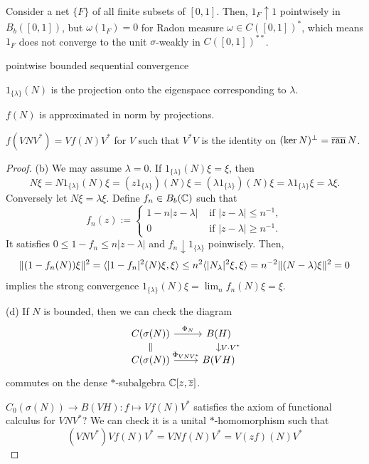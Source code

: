 \documentclass{../../large}
\begin{document}
\begin{prb}
Consider a net $\{F\}$ of all finite subsets of $[0,1]$.
Then, $1_F\uparrow1$ pointwisely in $B_b([0,1])$, but $\omega(1_F)=0$ for Radon measure $\omega\in C([0,1])^*$, which means $1_F$ does not converge to the unit $\sigma$-weakly in $C([0,1])^{**}$.
\begin{parts}
\item pointwise bounded sequential convergence
\item $1_{\{\lambda\}}(N)$ is the projection onto the eigenspace corresponding to $\lambda$.
\item $f(N)$ is approximated in norm by projections.
\item $f(VNV^*)=Vf(N)V^*$ for $V$ such that $V^*V$ is the identity on $(\ker N)^\perp=\overline{\operatorname{ran}}\,N$.
\end{parts}
\end{prb}
\begin{proof}
(b)
We may assume $\lambda=0$.
If $1_{\{\lambda\}}(N)\xi=\xi$, then
\[N\xi=N1_{\{\lambda\}}(N)\xi=(z1_{\{\lambda\}})(N)\xi=(\lambda1_{\{\lambda\}})(N)\xi=\lambda1_{\{\lambda\}}\xi=\lambda\xi.\]
Conversely let $N\xi=\lambda\xi$.
Define $f_n\in B_b(\mathbb{C})$ such that
\[f_n(z):=\begin{cases}
1-n|z-\lambda|&\text{ if }|z-\lambda|\le n^{-1},\\
0&\text{ if }|z-\lambda|\ge n^{-1}.
\end{cases}\]
It satisfies $0\le1-f_n\le n|z-\lambda|$ and $f_n\downarrow 1_{\{\lambda\}}$ poinwisely.
Then,
\[\|(1-f_n(N))\xi\|^2=\langle|1-f_n|^2(N)\xi,\xi\rangle\le n^2\langle|N_\lambda|^2\xi,\xi\rangle=n^{-2}\|(N-\lambda)\xi\|^2=0\]
implies the strong convergence $1_{\{\lambda\}}(N)\xi=\lim_nf_n(N)\xi=\xi$.

(d)
If $N$ is bounded, then we can check the diagram
\[\begin{tikzcd}[row sep=small]
C(\sigma(N))\ar[equals]{d}\ar{r}{\Phi_N} & B(H) \ar{d}{V\cdot V^*}\\
C(\sigma(N))\ar{r}{\Phi_{VNV^*}} & B(VH)
\end{tikzcd}\]
commutes on the dense $*$-subalgebra $\mathbb{C}[z,\overline z]$.

$C_0(\sigma(N))\to B(VH):f\mapsto Vf(N)V^*$ satisfies the axiom of functional calculus for $VNV^*$?
We can check it is a unital $*$-homomorphism such that
\[(VNV^*)Vf(N)V^*=VNf(N)V^*=V(zf)(N)V^*\]
\end{proof}
\end{document}
